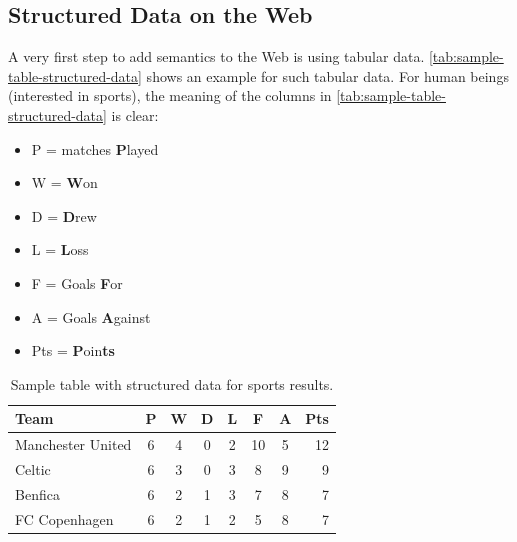\subsection{Structured Data on the Web}
A very first step to add semantics to the Web
is using tabular data.
\autoref{tab:sample-table-structured-data} shows an example
for such tabular data.
For human beings (interested in sports),
the meaning of the columns in
\autoref{tab:sample-table-structured-data} is clear:

\begin{itemize}
  \item P = matches \textbf{P}layed
  \item W = \textbf{W}on 
  \item D = \textbf{D}rew
  \item L = \textbf{L}oss
  \item F = Goals \textbf{F}or
  \item A = Goals \textbf{A}gainst
  \item Pts = \textbf{P}oin\textbf{ts}
\end{itemize}

\begin{table}[b!]
  \begin{center}
    \begin{tabular}{l*{6}{c}r}
Team              & P & W & D & L & F  & A & Pts \\
\hline
Manchester United & 6 & 4 & 0 & 2 & 10 & 5 & 12  \\
Celtic            & 6 & 3 & 0 & 3 &  8 & 9 &  9  \\
Benfica           & 6 & 2 & 1 & 3 &  7 & 8 &  7  \\
FC Copenhagen     & 6 & 2 & 1 & 2 &  5 & 8 &  7  \\
    \end{tabular}
    \caption{Sample table with structured data for sports results.}
    \label{tab:sample-table-structured-data}
  \end{center}
\end{table}

